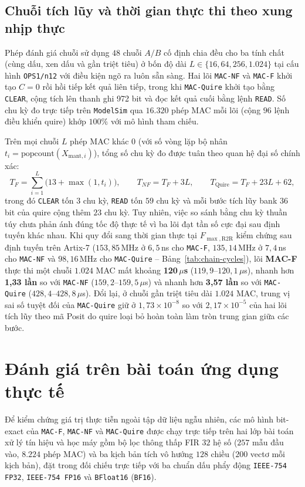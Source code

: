 \subsection{Chuỗi tích lũy và thời gian thực thi theo xung nhịp thực}
Phép đánh giá chuỗi sử dụng $48$ chuỗi $A/B$ cố định chia đều cho ba tính chất
(cùng dấu, xen dấu và gần triệt tiêu) ở bốn độ dài $L \in \{16, 64, 256, 1.024\}$
tại cấu hình \texttt{OPS1/n12} với điều kiện ngõ ra luôn sẵn sàng. Hai lõi
\texttt{MAC-NF} và \texttt{MAC-F} khởi tạo $C=0$ rồi hồi tiếp kết quả liên tiếp,
trong khi \texttt{MAC-Quire} khởi tạo bằng \texttt{CLEAR}, cộng tích lên thanh ghi
972 bit và đọc kết quả cuối bằng lệnh \texttt{READ}. Số chu kỳ đo trực tiếp trên
\texttt{ModelSim} qua $16.320$ phép MAC mỗi lõi (cộng $96$ lệnh điều khiển quire)
khớp $100\%$ với mô hình tham chiếu.



Trên mọi chuỗi $L$ phép MAC khác $0$ (với số vòng lặp bộ nhân $t_i = \mathrm{popcount}(X_{\mathrm{mant},i})$),
tổng số chu kỳ đo được tuân theo quan hệ đại số chính xác:
\[
  T_F = \sum_{i=1}^{L}\bigl(13 + \max(1,t_i)\bigr),\qquad
  T_{NF} = T_F + 3L,\qquad
  T_{\text{Quire}} = T_F + 23L + 62,
\]
trong đó \texttt{CLEAR} tốn $3$ chu kỳ, \texttt{READ} tốn $59$ chu kỳ và mỗi bước
tích lũy bank 36 bit của quire cộng thêm $23$ chu kỳ. Tuy nhiên, việc so sánh bằng
chu kỳ thuần túy chưa phản ánh đúng tốc độ thực tế vì ba lõi đạt tần số cực đại
sau định tuyến khác nhau. Khi quy đổi sang thời gian thực tại $F_{\max,\mathrm{R2R}}$
kiểm chứng sau định tuyến trên Artix-7 ($153{,}85$\,MHz ở $6{,}5$\,ns cho \texttt{MAC-F},
$135{,}14$\,MHz ở $7{,}4$\,ns cho \texttt{MAC-NF} và $98{,}16$\,MHz cho \texttt{MAC-Quire}
-- Bảng~\ref{tab:chain-cycles}), lõi \textbf{MAC-F} thực thi một chuỗi $1.024$ MAC mất
khoảng \textbf{120\,$\mu$s} ($119{,}9\text{--}120{,}1\,\mu$s), nhanh hơn \textbf{1,33 lần}
so với \texttt{MAC-NF} ($159{,}2\text{--}159{,}5\,\mu$s) và nhanh hơn \textbf{3,57 lần}
so với \texttt{MAC-Quire} ($428{,}4\text{--}428{,}8\,\mu$s).
Đổi lại, ở chuỗi gần triệt tiêu dài $1.024$ MAC, trung vị sai số tuyệt đối của
\texttt{MAC-Quire} giữ ở $1{,}73{\times}10^{-8}$ so với $2{,}17{\times}10^{-5}$
của hai lõi tích lũy theo mã Posit do quire loại bỏ hoàn toàn làm tròn trung gian
giữa các bước.

\section{Đánh giá trên bài toán ứng dụng thực tế}
\label{sec:app-benchmarks}
Để kiểm chứng giá trị thực tiễn ngoài tập dữ liệu ngẫu nhiên, các mô hình bit-exact
của \texttt{MAC-F}, \texttt{MAC-NF} và \texttt{MAC-Quire} được chạy trực tiếp trên
hai lớp bài toán xử lý tín hiệu và học máy gồm bộ lọc thông thấp FIR $32$ hệ số
($257$ mẫu đầu vào, $8.224$ phép MAC) và ba kịch bản tích vô hướng $128$ chiều
($200$ vectơ mỗi kịch bản), đặt trong đối chiếu trực tiếp với ba chuẩn dấu phẩy
động \texttt{IEEE-754 FP32}, \texttt{IEEE-754 FP16} và \texttt{BFloat16}
(\texttt{BF16}).

